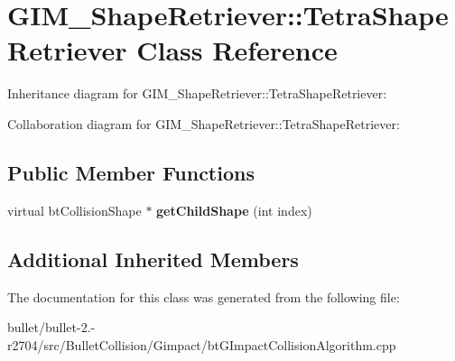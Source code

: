 \hypertarget{class_g_i_m___shape_retriever_1_1_tetra_shape_retriever}{\section{G\+I\+M\+\_\+\+Shape\+Retriever\+:\+:Tetra\+Shape\+Retriever Class Reference}
\label{class_g_i_m___shape_retriever_1_1_tetra_shape_retriever}
}


Inheritance diagram for G\+I\+M\+\_\+\+Shape\+Retriever\+:\+:Tetra\+Shape\+Retriever\+:


Collaboration diagram for G\+I\+M\+\_\+\+Shape\+Retriever\+:\+:Tetra\+Shape\+Retriever\+:
\subsection*{Public Member Functions}
\begin{DoxyCompactItemize}
\item 
\hypertarget{class_g_i_m___shape_retriever_1_1_tetra_shape_retriever_a377761f5c9db09888a8828741e2e7297}{virtual bt\+Collision\+Shape $\ast$ {\bfseries get\+Child\+Shape} (int index)}\label{class_g_i_m___shape_retriever_1_1_tetra_shape_retriever_a377761f5c9db09888a8828741e2e7297}

\end{DoxyCompactItemize}
\subsection*{Additional Inherited Members}


The documentation for this class was generated from the following file\+:\begin{DoxyCompactItemize}
\item 
bullet/bullet-\/2.-\/r2704/src/\+Bullet\+Collision/\+Gimpact/bt\+G\+Impact\+Collision\+Algorithm.\+cpp\end{DoxyCompactItemize}
